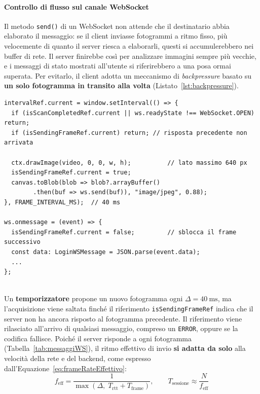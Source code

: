 \paragraph{Controllo di flusso sul canale WebSocket}
Il metodo \texttt{send()} di un WebSocket non attende che il destinatario abbia elaborato il messaggio: se il client inviasse fotogrammi a ritmo fisso, più velocemente di quanto il server riesca a elaborarli, questi si accumulerebbero nei buffer di rete.
Il server finirebbe così per analizzare immagini sempre più vecchie, e i messaggi di stato mostrati all'utente si riferirebbero a una posa ormai superata.
Per evitarlo, il client adotta un meccanismo di \textit{backpressure} basato su \textbf{un solo fotogramma in transito alla volta} (Listato~\ref{lst:backpressure}).
\begin{lstlisting}[float=htbp, caption={Controllo di flusso con un solo fotogramma in transito (estratto da \texttt{components/CameraScanner.tsx}).}, label={lst:backpressure}]
intervalRef.current = window.setInterval(() => {
  if (isScanCompletedRef.current || ws.readyState !== WebSocket.OPEN) return;
  if (isSendingFrameRef.current) return; // risposta precedente non arrivata

  ctx.drawImage(video, 0, 0, w, h);          // lato massimo 640 px
  isSendingFrameRef.current = true;
  canvas.toBlob(blob => blob?.arrayBuffer()
        .then(buf => ws.send(buf)), "image/jpeg", 0.88);
}, FRAME_INTERVAL_MS);  // 40 ms

ws.onmessage = (event) => {
  isSendingFrameRef.current = false;         // sblocca il frame successivo
  const data: LoginWSMessage = JSON.parse(event.data);
  ...
};
\end{lstlisting}
\\Un \textbf{temporizzatore} propone un nuovo fotogramma ogni $\Delta = 40~\text{ms}$, ma l'acquisizione viene saltata finché il riferimento \texttt{isSendingFrameRef} indica che il server non ha ancora risposto al fotogramma precedente. Il riferimento viene rilasciato all'arrivo di qualsiasi messaggio, compreso un \texttt{ERROR}, oppure se la codifica fallisce.
Poiché il server risponde a ogni fotogramma (Tabella~\ref{tab:messaggiWS}), il ritmo effettivo di invio \textbf{si adatta da solo} alla velocità della rete e del backend, come espresso dall'Equazione~\eqref{eq:frameRateEffettivo}:
\begin{equation}
    \label{eq:frameRateEffettivo}
    f_{\text{eff}} = \frac{1}{\max\left(\Delta, \; T_{\text{rtt}} + T_{\text{frame}}\right)}, \qquad T_{\text{sessione}} \approx \frac{N}{f_{\text{eff}}}
\end{equation}
